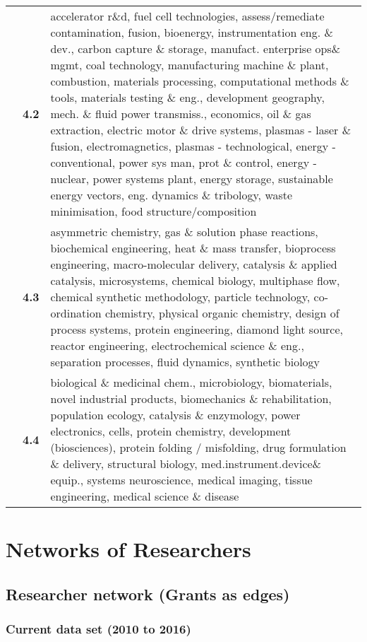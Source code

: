 \begin{spacing}{0.9}
\begin{longtable}[r]{r|r|p{11.5cm}}
& \textbf{4.2} & {accelerator r\&d, fuel cell technologies, assess/remediate contamination, fusion, bioenergy, instrumentation eng. \& dev., carbon capture \& storage, manufact. enterprise ops\& mgmt, coal technology, manufacturing machine \& plant, combustion, materials processing, computational methods \& tools, materials testing \& eng., development geography, mech. \& fluid power transmiss., economics, oil \& gas extraction, electric motor \& drive systems, plasmas - laser \& fusion, electromagnetics, plasmas - technological, energy - conventional, power sys man, prot \& control, energy - nuclear, power systems plant, energy storage, sustainable energy vectors, eng. dynamics \& tribology, waste minimisation, food structure/composition}\\
& \textbf{4.3} & {asymmetric chemistry, gas \& solution phase reactions, biochemical engineering, heat \& mass transfer, bioprocess engineering, macro-molecular delivery, catalysis \& applied catalysis, microsystems, chemical biology, multiphase flow, chemical synthetic methodology, particle technology, co-ordination chemistry, physical organic chemistry, design of process systems, protein engineering, diamond light source, reactor engineering, electrochemical science \& eng., separation processes, fluid dynamics, synthetic biology}\\
& \textbf{4.4} & {biological \& medicinal chem., microbiology, biomaterials, novel industrial products, biomechanics \& rehabilitation, population ecology, catalysis \& enzymology, power electronics, cells, protein chemistry, development (biosciences), protein folding / misfolding, drug formulation \& delivery, structural biology, med.instrument.device\& equip., systems neuroscience, medical imaging, tissue engineering, medical science \& disease}\\
\end{longtable}
\end{spacing}

\clearpage

\section{Networks of Researchers}

\subsection{Researcher network (Grants as edges)}

\subsubsection{Current data set (2010 to 2016)}

